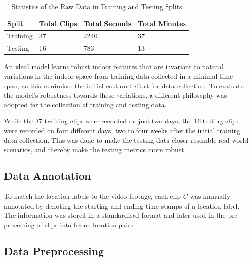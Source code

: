 \documentclass[a4paper]{article}
\begin{document}
  \begin{table}[ht]
    \centering
    \begin{tabular}{llll}
    \toprule
    \bfseries Split & Total Clips & Total Seconds & Total Minutes \\
    \midrule
    Training & 37 &  2240 & 37 \\
    Testing & 16 & 783 & 13 \\
    \bottomrule
    \end{tabular}
    \caption{Statistics of the Raw Data in Training and Testing Splits}
    \label{tab:data-stats}
  \end{table}

  An ideal model learns robust indoor features that are invariant to natural 
  variations in the indoor space from training data collected in a minimal time
  span, as this minimises the initial cost and effort for data collection.
  To evaluate the model's robustness towards these variations, a different
  philosophy was adopted for the collection of training and testing data.

  While the 37 training clips were recorded on just two days, the 16 testing
  clips were recorded on four different days, two to four weeks after the
  initial training data collection. This was done to make the testing data
  closer resemble real-world scenarios, and thereby make the testing metrics
  more robust.
  


  \subsection{Data Annotation} %
  \label{sub:data-annotation}
  
  To match the location labels to the video footage, each clip $C$ was manually
  annotated by denoting the starting and ending time stamps of a location label.
  The information was stored in a standardised format and later used in the
  pre-processing of clips into frame-location pairs.
  

  \subsection{Data Preprocessing} %
  \label{sub:data-preprocessing}
\end{document}
